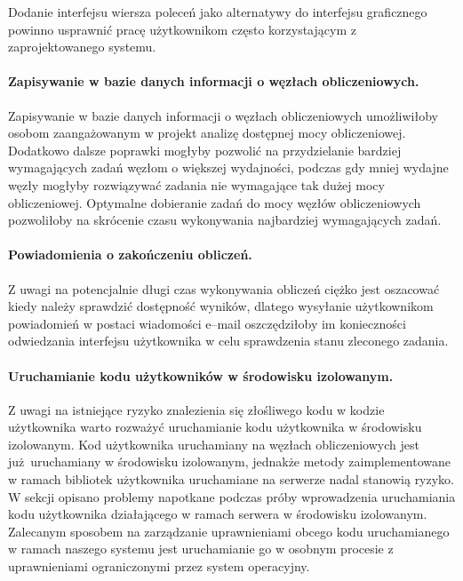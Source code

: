 \documentclass[a4paper,11pt,twoside]{report}
\theoremstyle{definition}
\begin{document}
        Dodanie interfejsu wiersza poleceń jako alternatywy do interfejsu graficznego powinno usprawnić pracę użytkownikom często korzystającym z zaprojektowanego systemu.
        
        \paragraph{Zapisywanie w bazie danych informacji o węzłach obliczeniowych.}
        Zapisywanie w bazie danych informacji o węzłach obliczeniowych umożliwiłoby osobom zaangażowanym w projekt analizę dostępnej mocy obliczeniowej. 
        Dodatkowo dalsze poprawki mogłyby pozwolić na przydzielanie bardziej wymagających zadań węzłom o większej wydajności, podczas gdy mniej wydajne węzły mogłyby rozwiązywać zadania nie wymagające tak dużej mocy obliczeniowej.
        Optymalne dobieranie zadań do mocy węzłów obliczeniowych pozwoliłoby na skrócenie czasu wykonywania najbardziej wymagających zadań.
        
        \paragraph{Powiadomienia o zakończeniu obliczeń.}
        Z uwagi na potencjalnie długi czas wykonywania obliczeń ciężko jest oszacować kiedy należy sprawdzić dostępność wyników, dlatego wysyłanie użytkownikom powiadomień w postaci wiadomości e--mail oszczędziłoby im konieczności odwiedzania interfejsu użytkownika w celu sprawdzenia stanu zleconego zadania.
        
        \paragraph{Uruchamianie kodu użytkowników w środowisku izolowanym.}
        Z uwagi na istniejące ryzyko znalezienia się złośliwego kodu w kodzie użytkownika warto rozważyć uruchamianie kodu użytkownika w środowisku izolowanym. Kod użytkownika uruchamiany na węzłach obliczeniowych jest już uruchamiany w środowisku izolowanym, jednakże metody zaimplementowane w ramach bibliotek użytkownika uruchamiane na serwerze nadal stanowią ryzyko.
        W sekcji %
        opisano problemy napotkane podczas próby wprowadzenia uruchamiania kodu użytkownika działającego w ramach serwera w środowisku izolowanym. 
        Zalecanym sposobem na zarządzanie uprawnieniami obcego kodu uruchamianego w ramach naszego systemu jest uruchamianie go w osobnym procesie z uprawnieniami ograniczonymi przez system operacyjny.
        
\end{document}
